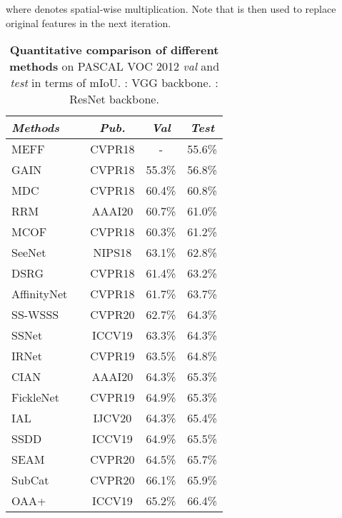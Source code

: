 \documentclass[letterpaper]{article} \usepackage{aaai21}  \usepackage{times}  \usepackage{helvet} \usepackage{courier}  \usepackage[hyphens]{url}  \usepackage{graphicx} \urlstyle{rm} \def\UrlFont{\rm}  \usepackage{graphicx}  \usepackage{natbib}  \usepackage{caption} \frenchspacing  \setlength{\pdfpagewidth}{8.5in}  \setlength{\pdfpageheight}{11in}
\begin{document}
where  denotes spatial-wise multiplication. Note that  is then used to replace original features  in the next iteration.

\begin{table}[t]
	\centering
	\small
	\caption{\small \textbf{Quantitative comparison of different methods} on PASCAL VOC 2012 \textit{val} and \textit{test} in terms of mIoU. : VGG backbone. : ResNet backbone.}
	\begin{tabular}{l|c|cc}
		\hlineB{2.5}
		\textit{Methods} & \textit{Pub.}  &  \textit{Val} & \textit{Test} \\ \hline\hline
		
		
		MEFF{\!~\tiny~\cite{ge2018multi}} & CVPR18 & - & 55.6\% \\ 
		GAIN{\!~\tiny~\cite{li2018tell}} & CVPR18 & 55.3\% & 56.8\% \\ 
MDC{\!~\tiny~\cite{wei2018revisiting}}  & CVPR18  & 60.4\% & 60.8\% \\
		RRM{\!~\tiny~\cite{zhang2020reliability}}  & AAAI20  & 60.7\% & 61.0\% \\	
		MCOF{\!~\tiny~\cite{wang2018weakly}} & CVPR18  & 60.3\% & 61.2\% \\
SeeNet{\!~\tiny~\cite{hou2018self}}  & NIPS18  & 63.1\% & 62.8\% \\
		DSRG{\!~\tiny~\cite{huang2018weakly}} & CVPR18  & 61.4\% & 63.2\% \\
		AffinityNet{\!~\tiny~\cite{ahn2018learning}} & CVPR18  & 61.7\% & 63.7\% \\
		SS-WSSS{\!~\tiny~\cite{araslanov2020single}} & CVPR20  & 62.7\% & 64.3\% \\
		SSNet{\!~\tiny~\cite{zeng2019joint}} & ICCV19  & 63.3\% & 64.3\% \\
		IRNet{\!~\tiny~\cite{ahn2019weakly}} & CVPR19  & 63.5\% & 64.8\% \\ 
		CIAN{\!~\tiny~\cite{fan2020cian}}  & AAAI20  & 64.3\% & 65.3\% \\
		FickleNet{\!~\tiny~\cite{lee2019ficklenet}}  & CVPR19  & 64.9\% & 65.3\% \\
		IAL{\!~\tiny~\cite{wang2020weakly}} & IJCV20 & 64.3\% & 65.4\% \\
		SSDD{\!~\tiny~\cite{shimoda2019self}}  & ICCV19  & 64.9\% & 65.5\% \\
		SEAM{\!~\tiny~\cite{wang2020self}}  & CVPR20  & 64.5\% & 65.7\% \\
		SubCat{\!~\tiny~\cite{chang2020weakly}}  & CVPR20  & 66.1\% & 65.9\% \\
		OAA+{\!~\tiny~\cite{jiang2019integral}}  & ICCV19  & 65.2\% & 66.4\% \\

\end{tabular}
\end{table}
\end{document}
